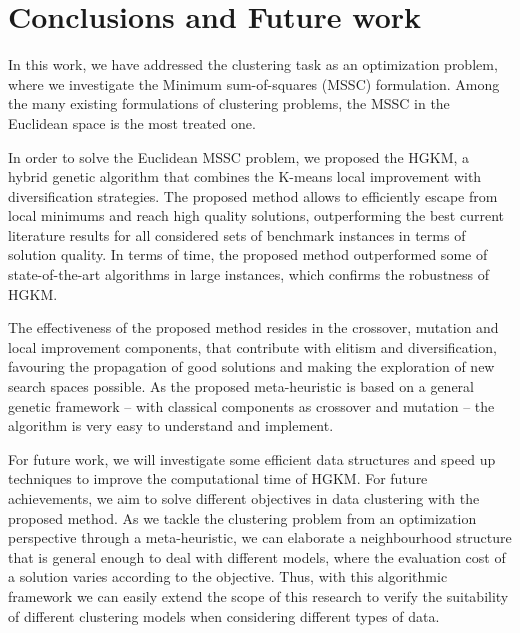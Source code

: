 \chapter{Conclusions and Future work}

In this work, we have addressed the clustering task as an optimization problem, where we investigate the Minimum sum-of-squares (MSSC) formulation. Among the many existing formulations of clustering problems, the MSSC in the Euclidean space is the most treated one.

In order to solve the Euclidean MSSC problem, we proposed the HGKM, a hybrid genetic algorithm that combines the K-means local improvement with diversification strategies. The proposed method allows to efficiently escape from local minimums and reach high quality solutions, outperforming the best current literature results for all considered sets of benchmark instances in terms of solution quality. In terms of time, the proposed method outperformed some of state-of-the-art algorithms in large instances, which confirms the robustness of HGKM.

The effectiveness of the proposed method resides in the crossover, mutation and local improvement components, that contribute with elitism and diversification, favouring the propagation of good solutions and making the exploration of new search spaces possible. As the proposed meta-heuristic is based on a general genetic framework -- with classical components as crossover and mutation -- the algorithm is very easy to understand and implement.

For future work, we will investigate some efficient data structures and speed up techniques to improve the computational time of HGKM. For future achievements, we aim to solve different objectives in data clustering with the proposed method. As we tackle the clustering problem from an optimization perspective through a meta-heuristic, we can elaborate a neighbourhood structure that is general enough to deal with different models, where the evaluation cost of a solution varies according to the objective. Thus, with this algorithmic framework we can easily extend the scope of this research to verify the suitability of different clustering models when considering different types of data.
